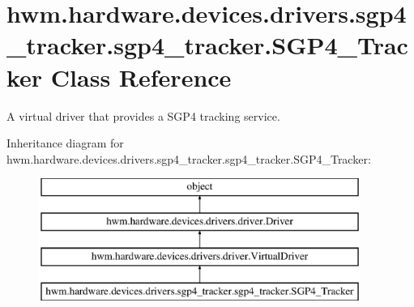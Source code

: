 \hypertarget{classhwm_1_1hardware_1_1devices_1_1drivers_1_1sgp4__tracker_1_1sgp4__tracker_1_1_s_g_p4___tracker}{\section{hwm.\-hardware.\-devices.\-drivers.\-sgp4\-\_\-tracker.\-sgp4\-\_\-tracker.\-S\-G\-P4\-\_\-\-Tracker Class Reference}
\label{classhwm_1_1hardware_1_1devices_1_1drivers_1_1sgp4__tracker_1_1sgp4__tracker_1_1_s_g_p4___tracker}
}


A virtual driver that provides a S\-G\-P4 tracking service.  


Inheritance diagram for hwm.\-hardware.\-devices.\-drivers.\-sgp4\-\_\-tracker.\-sgp4\-\_\-tracker.\-S\-G\-P4\-\_\-\-Tracker\-:\begin{figure}[H]
\begin{center}
\leavevmode
\includegraphics[height=4.000000cm]{classhwm_1_1hardware_1_1devices_1_1drivers_1_1sgp4__tracker_1_1sgp4__tracker_1_1_s_g_p4___tracker}
\end{center}
\end{figure}
